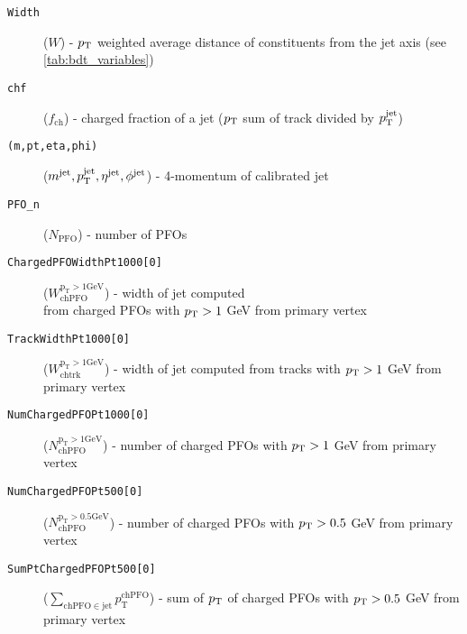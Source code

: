 \begin{description}
    \item[\texttt{Width}]  ($W$) -  $p_\text{T}$ weighted average distance of constituents from the jet axis (see \cref{tab:bdt_variables})
    \item[\texttt{chf}]  ($f_{\text{ch}}$) -  charged fraction of a jet ($p_\text{T}$ sum of track divided by $p_\text{T}^{\text{jet}}$)
    \item[\texttt{(m,pt,eta,phi)}]  ($m^{\text{jet}},p_\text{T}^{\text{jet}}, \eta^{\text{jet}}, \phi^{\text{jet}}$) -  4-momentum of calibrated jet
    \item[\texttt{PFO\_n}]  ($N_{\text{PFO}}$) -  number of PFOs
    \item[\texttt{ChargedPFOWidthPt1000[0]}] ($W_{\mathrm{chPFO}}^{\mathrm{p_{\mathrm{T}} > 1 \mathrm{GeV}}}$) - width of jet computed \\
    from charged PFOs with $p_\text{T} > 1$ GeV from primary vertex
    \item[\texttt{TrackWidthPt1000[0]}] ($W_{\mathrm{chtrk}}^{\mathrm{p_{\mathrm{T}} > 1 \mathrm{GeV}}}$)  -  width of jet computed from tracks with $p_\text{T} > 1$ GeV from primary vertex
    \item[\texttt{NumChargedPFOPt1000[0]}] ($N_{\mathrm{chPFO}}^{\mathrm{p_{\mathrm{T}} > 1 \mathrm{GeV}}}$)  -  number of charged PFOs with $p_\text{T} > 1$ GeV from primary vertex
    \item[\texttt{NumChargedPFOPt500[0]}] ($N_{\mathrm{ch PFO}}^{\mathrm{p_{\mathrm{T}} > 0.5 \mathrm{GeV}}}$) -  number of charged PFOs with $p_\text{T} > 0.5$ GeV from primary vertex
    \item[\texttt{SumPtChargedPFOPt500[0]}] ($\sum_{\mathrm{ch PFO} \in \mathrm{jet}} p_{\mathrm{T}}^{\mathrm{ch PFO}}$) -  sum of $p_\text{T}$ of charged PFOs with $p_\text{T} > 0.5$ GeV from primary vertex
\end{description}

